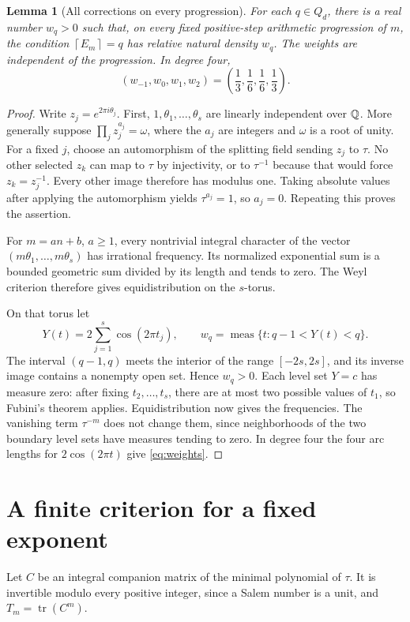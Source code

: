 \documentclass[11pt,a4paper]{article}
\newtheorem{lemma}[theorem]{Lemma}
\theoremstyle{definition}\newtheorem{definition}[theorem]{Definition}
\theoremstyle{remark}\newtheorem{remark}[theorem]{Remark}
\newcommand{\ceil}[1]{\left\lceil#1\right\rceil}
\begin{document}
\begin{lemma}[All corrections on every progression]\label{lem:distribution}
For each $q\in Q_d$, there is a real number $w_q>0$ such that, on every fixed positive-step arithmetic progression of $m$, the condition $\ceil{E_m}=q$ has relative natural density $w_q$. The weights are independent of the progression. In degree four,
\begin{equation}\label{eq:weights}
 (w_{-1},w_0,w_1,w_2)=\left(\frac13,\frac16,\frac16,\frac13\right).
\end{equation}
\end{lemma}
\begin{proof}
Write $z_j=e^{2\pi i\theta_j}$. First, $1,\theta_1,\ldots,\theta_s$ are linearly independent over $\mathbb Q$. More generally suppose $\prod_jz_j^{a_j}=\omega$, where the $a_j$ are integers and $\omega$ is a root of unity. For a fixed $j$, choose an automorphism of the splitting field sending $z_j$ to $\tau$. No other selected $z_k$ can map to $\tau$ by injectivity, or to $\tau^{-1}$ because that would force $z_k=z_j^{-1}$. Every other image therefore has modulus one. Taking absolute values after applying the automorphism yields $\tau^{a_j}=1$, so $a_j=0$. Repeating this proves the assertion.

For $m=an+b$, $a\ge1$, every nontrivial integral character of the vector $(m\theta_1,\ldots,m\theta_s)$ has irrational frequency. Its normalized exponential sum is a bounded geometric sum divided by its length and tends to zero. The Weyl criterion therefore gives equidistribution on the $s$-torus.

On that torus let
\[
 Y(t)=2\sum_{j=1}^s\cos(2\pi t_j),
 \qquad w_q=\operatorname{meas}\{t:q-1<Y(t)<q\}.
\]
The interval $(q-1,q)$ meets the interior of the range $[-2s,2s]$, and its inverse image contains a nonempty open set. Hence $w_q>0$. Each level set $Y=c$ has measure zero: after fixing $t_2,\ldots,t_s$, there are at most two possible values of $t_1$, so Fubini's theorem applies. Equidistribution now gives the frequencies. The vanishing term $\tau^{-m}$ does not change them, since neighborhoods of the two boundary level sets have measures tending to zero. In degree four the four arc lengths for $2\cos(2\pi t)$ give \eqref{eq:weights}.
\end{proof}

\section{A finite criterion for a fixed exponent}
Let $C$ be an integral companion matrix of the minimal polynomial of $\tau$. It is invertible modulo every positive integer, since a Salem number is a unit, and $T_m=\operatorname{tr}(C^m)$.
\end{document}

